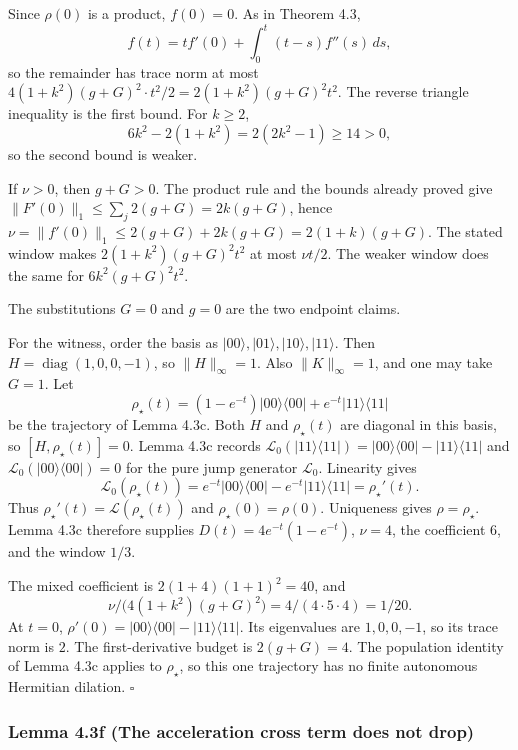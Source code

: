 \documentclass[
  11pt,
]{article}
\begin{document}
Since \(\rho(0)\) is a product, \(f(0)=0\). As in Theorem 4.3,
\[
f(t)=tf'(0)+\int_0^t(t-s)f''(s)\,ds,
\]
so the remainder has trace norm at most
\(4(1+k^2)(g+G)^2\cdot t^2/2=2(1+k^2)(g+G)^2t^2\). The reverse
triangle inequality is the first bound. For \(k\ge 2\),
\[
6k^2-2(1+k^2)=2(2k^2-1)\ge 14>0,
\]
so the second bound is weaker.

If \(\nu>0\), then \(g+G>0\). The product rule and the bounds already
proved give \(\|F'(0)\|_1\le\sum_j 2(g+G)=2k(g+G)\), hence
\(\nu=\|f'(0)\|_1\le 2(g+G)+2k(g+G)=2(1+k)(g+G)\). The stated window
makes \(2(1+k^2)(g+G)^2t^2\) at most \(\nu t/2\). The weaker window
does the same for \(6k^2(g+G)^2t^2\).

The substitutions \(G=0\) and \(g=0\) are the two endpoint claims.

For the witness, order the basis as
\(|00\rangle,|01\rangle,|10\rangle,|11\rangle\). Then
\(H=\operatorname{diag}(1,0,0,-1)\), so \(\|H\|_\infty=1\). Also
\(\|K\|_\infty=1\), and one may take \(G=1\). Let
\[
\rho_\star(t)
=(1-e^{-t})|00\rangle\langle00|+e^{-t}|11\rangle\langle11|
\]
be the trajectory of Lemma 4.3c. Both \(H\) and \(\rho_\star(t)\) are
diagonal in this basis, so \([H,\rho_\star(t)]=0\). Lemma 4.3c records
\(\mathcal L_0(|11\rangle\langle11|)
=|00\rangle\langle00|-|11\rangle\langle11|\) and
\(\mathcal L_0(|00\rangle\langle00|)=0\) for the pure jump generator
\(\mathcal L_0\). Linearity gives
\[
\mathcal L_0(\rho_\star(t))
=e^{-t}|00\rangle\langle00|-e^{-t}|11\rangle\langle11|
=\rho_\star'(t).
\]
Thus \(\rho_\star'(t)=\mathcal L(\rho_\star(t))\) and
\(\rho_\star(0)=\rho(0)\). Uniqueness gives \(\rho=\rho_\star\).
Lemma 4.3c therefore supplies
\(D(t)=4e^{-t}(1-e^{-t})\), \(\nu=4\), the coefficient \(6\), and the
window \(1/3\).

The mixed coefficient is \(2(1+4)(1+1)^2=40\), and
\[
\nu/\bigl(4(1+k^2)(g+G)^2\bigr)=4/(4\cdot 5\cdot 4)=1/20.
\]
At \(t=0\),
\(\rho'(0)=|00\rangle\langle00|-|11\rangle\langle11|\). Its eigenvalues
are \(1,0,0,-1\), so its trace norm is \(2\). The first-derivative
budget is \(2(g+G)=4\). The population identity of Lemma 4.3c applies
to \(\rho_\star\), so this one trajectory has no finite autonomous Hermitian
dilation. \(\square\)

\subsubsection{Lemma 4.3f (The acceleration cross term does not drop)}\label{lemma-4.3f-the-acceleration-cross-term-does-not-drop}
\end{document}
